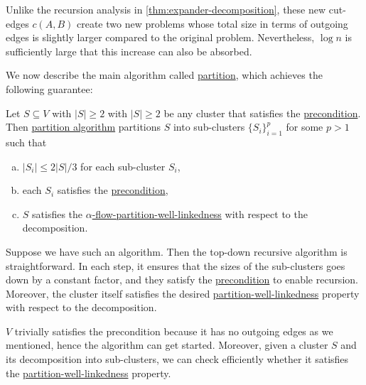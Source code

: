 \begin{remark}
	Unlike the recursion analysis in \autoref{thm:expander-decomposition}, these new cut-edges \(c(A, B)\) create two new problems whose total size in terms of outgoing edges is slightly larger compared to the original problem. Nevertheless, \(\log n\) is sufficiently large that this increase can also be absorbed.
\end{remark}

We now describe the main algorithm called \hyperref[algo:partition]{partition}, which achieves the following guarantee:

\begin{lemma}\label{lma:partition}
	Let \(S \subseteq V\) with \(\lvert S \rvert \geq 2\) with \(\lvert S \rvert \geq 2\) be any cluster that satisfies the \hyperref[def:precondition]{precondition}. Then \hyperref[algo:partition]{partition algorithm} partitions \(S\) into sub-clusters \(\{ S_i \} _{i=1}^{p}\) for some \(p > 1\) such that
	\begin{enumerate}[(a)]
		\item\label{lma:partition-a} \(\lvert S_i \rvert \leq 2 \lvert S \rvert / 3\) for each sub-cluster \(S_i\),
		\item\label{lma:partition-b} each \(S_i\) satisfies the \hyperref[def:precondition]{precondition},
		\item\label{lma:partition-c} \(S\) satisfies the \hyperref[def:partition-and-boundary-well-linked]{\(\alpha \)-flow-partition-well-linkedness} with respect to the decomposition.
	\end{enumerate}
\end{lemma}

Suppose we have such an algorithm. Then the top-down recursive algorithm is straightforward. In each step, it ensures that the sizes of the sub-clusters goes down by a constant factor, and they satisfy the \hyperref[def:precondition]{precondition} to enable recursion. Moreover, the cluster itself satisfies the desired \hyperref[def:partition-and-boundary-well-linked]{partition-well-linkedness} property with respect to the decomposition.

\begin{prev}
	\(V\) trivially satisfies the precondition because it has no outgoing edges as we mentioned, hence the algorithm can get started. Moreover, given a cluster \(S\) and its decomposition into sub-clusters, we can check efficiently whether it satisfies the \hyperref[def:partition-and-boundary-well-linked]{partition-well-linkedness} property.
\end{prev}

